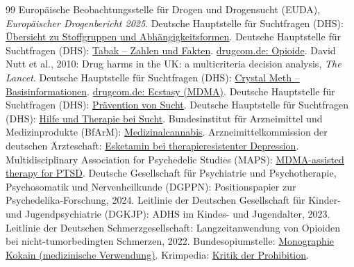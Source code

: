 \documentclass[11pt,a4paper]{article}
\begin{document}
\begin{thebibliography}{99}
		 Europäische Beobachtungsstelle für Drogen und Drogensucht (EUDA), \textit{Europäischer Drogenbericht 2025}.
		 Deutsche Hauptstelle für Suchtfragen (DHS): \href{https://www.dhs.de/suechte}{Übersicht zu Stoffgruppen und Abhängigkeitsformen}.
		 Deutsche Hauptstelle für Suchtfragen (DHS): \href{https://www.dhs.de/suechte/tabak}{Tabak – Zahlen und Fakten}.
		 \href{https://www.drugcom.de/drogen/opioide/}{drugcom.de: Opioide}.
		 David Nutt et al., 2010: Drug harms in the UK: a multicriteria decision analysis, \textit{The Lancet}.
		 Deutsche Hauptstelle für Suchtfragen (DHS): \href{https://www.dhs.de/suechte/crystal-meth}{Crystal Meth – Basisinformationen}.
		 \href{https://www.drugcom.de/drogen/ecstasy/}{drugcom.de: Ecstasy (MDMA)}.
		 Deutsche Hauptstelle für Suchtfragen (DHS): \href{https://www.dhs.de/praevention}{Prävention von Sucht}.
		 Deutsche Hauptstelle für Suchtfragen (DHS): \href{https://www.dhs.de/hilfe-und-therapie}{Hilfe und Therapie bei Sucht}.
		 Bundesinstitut für Arzneimittel und Medizinprodukte (BfArM): \href{https://www.bfarm.de/DE/Bundesopiumstelle/Cannabis/Medizinalcannabis/_node.html}{Medizinalcannabis}.
		 Arzneimittelkommission der deutschen Ärzteschaft: \href{https://www.akdae.de/Arzneimitteltherapie/NA/A-2021-12/}{Esketamin bei therapieresistenter Depression}.
		 Multidisciplinary Association for Psychedelic Studies (MAPS): \href{https://maps.org/mdma/}{MDMA-assisted therapy for PTSD}.
		 Deutsche Gesellschaft für Psychiatrie und Psychotherapie, Psychosomatik und Nervenheilkunde (DGPPN): Positionspapier zur Psychedelika-Forschung, 2024.
		 Leitlinie der Deutschen Gesellschaft für Kinder- und Jugendpsychiatrie (DGKJP): ADHS im Kindes- und Jugendalter, 2023.
		 Leitlinie der Deutschen Schmerzgesellschaft: Langzeitanwendung von Opioiden bei nicht-tumorbedingten Schmerzen, 2022.
		 Bundesopiumstelle: \href{https://www.bfarm.de/DE/Bundesopiumstelle/Betaeubungsmittel/BtM-Monographie/_node.html}{Monographie Kokain (medizinische Verwendung)}.
		 Krimpedia: \href{https://www.krimpedia.de/index.php?title=Kritik_der_Prohibition&oldid=68308}{Kritik der Prohibition}.

\end{thebibliography}
\end{document}
